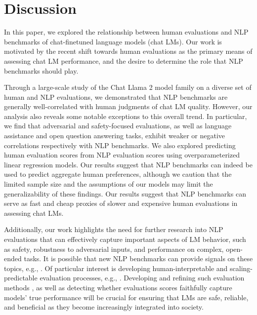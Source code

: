 \section{Discussion}

In this paper, we explored the relationship between human evaluations and NLP benchmarks of chat-finetuned language models (chat LMs). Our work is motivated by the recent shift towards human evaluations as the primary means of assessing chat LM performance, and the desire to determine the role that NLP benchmarks should play.

Through a large-scale study of the Chat Llama 2 model family on a diverse set of human and NLP evaluations, we demonstrated that NLP benchmarks are generally well-correlated with human judgments of chat LM quality. However, our analysis also reveals some notable exceptions to this overall trend. In particular, we find that adversarial and safety-focused evaluations, as well as language assistance and open question answering tasks, exhibit weaker or negative correlations respectively with NLP benchmarks. We also explored predicting human evaluation scores from NLP evaluation scores using overparameterized linear regression models. Our results suggest that NLP benchmarks can indeed be used to predict aggregate human preferences, although we caution that the limited sample size and the assumptions of our models may limit the generalizability of these findings. Our results suggest that NLP benchmarks can serve as fast and cheap proxies of slower and expensive human evaluations in assessing chat LMs.

Additionally, our work highlights the need for further research into NLP evaluations that can effectively capture important aspects of LM behavior, such as safety, robustness to adversarial inputs, and performance on complex, open-ended tasks. It is possible that new NLP benchmarks can provide signals on these topics, e.g., \citep{wang2023decodingtrust}. Of particular interest is developing human-interpretable and scaling-predictable evaluation processes, e.g., \citep{schaeffer2024emergent, ruan2024observational,schaeffer2024predictingdownstreamcapabilitiesfrontier}. Developing and refining such evaluation methods \citep{madaan2024quantifyingvarianceevaluationbenchmarks}, as well as detecting whether evaluations scores faithfully capture models' true performance \citep{oren2023proving,schaeffer2023pretrainingtestsetneed,roberts2023cutoff,jiang2024investigatingdatacontaminationpretraining,zhang2024careful,duan2024uncoveringlatentmemoriesassessing} will be crucial for ensuring that LMs are safe, reliable, and beneficial as they become increasingly integrated into society.

